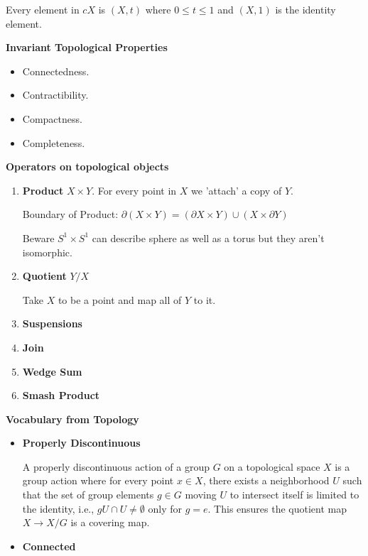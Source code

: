 \documentclass[12pt,a4paper]{report}
\begin{document}
\begin{description}
\begin{itemize}
		Every element in $cX$ is $(X, t)$ where $0\le t \le 1$ and $(X, 1)$ is the identity element.
		
	\end{itemize}
	
	\item \textbf{Invariant Topological Properties}
	\begin{itemize}
		\item Connectedness.
		\item Contractibility.
		\item Compactness.
		\item Completeness.
	\end{itemize}
	\item \textbf{Operators on topological objects}
	\begin{enumerate}
		\item \textbf{Product} $X \times Y$.  For every point in $X$ we 'attach' a copy of $Y$.
		
		Boundary of Product: $\partial (X \times Y) = (\partial X \times Y) \cup  (X\times\partial Y)$
		
		Beware $S^1 \times S^1$ can describe  sphere as well as a torus but they aren't isomorphic.
		
		\item \textbf{Quotient} $Y/X$
		
		Take $X$ to be a point and map all of $Y$ to it.

		\item \textbf{Suspensions}
		\item \textbf{Join}
		\item \textbf{Wedge Sum}
		\item \textbf{Smash Product}
	\end{enumerate}
	
	\item \textbf{Vocabulary from Topology}
	\begin{itemize}
		\item \textbf{Properly Discontinuous}
		
		A properly discontinuous action of a group \(G\) on a topological space \(X\) is a group action where for every point \(x\in X\), there exists a neighborhood \(U\) such that the set of group elements \(g\in G\) moving \(U\) to intersect itself is limited to the identity, i.e., \(gU\cap U\ne \emptyset \) only for \(g=e\). This ensures the quotient map \(X\rightarrow X/G\) is a covering map.
		
		\item \textbf{Connected}
				

\end{itemize}
\end{description}
\end{document}

